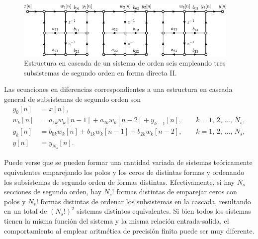 \documentclass[a4paper]{report}
\begin{document}
\begin{figure}[!htb]
 \begin{center}
 \includegraphics[width=0.96\textwidth]{figuras/structures_flow_graph_iir_cascade_direct_form_II.pdf}
 \caption{\label{fig:structures_flow_graph_iir_cascade_direct_form_II} Estructura en cascada de un sistema de orden seis empleando tres subsistemas de segundo orden en forma directa II.}
 \end{center}
\end{figure}
Las ecuaciones en diferencias correspondientes a una estructura en cascada general de subsistemas de segundo orden son
\begin{align*}
 y_0[n]&=x[n],\\
 w_k[n]&=a_{1k}w_k[n-1]+a_{2k}w_k[n-2]+y_{k-1}[n],\qquad k=1,\,2,\,\dots,\,N_s,\\
 y_k[n]&=b_{0k}w_k[n]+b_{1k}w_k[n-1]+b_{2k}w_k[n-2],\qquad k=1,\,2,\,\dots,\,N_s,\\
 y[n]&=y_{N_s}[n].
\end{align*}

Puede verse que se pueden formar una cantidad variada de sistemas teóricamente equivalentes emparejando los polos y los ceros de distintas formas y ordenando los subsistemas de segundo orden de formas distintas. Efectivamente, si hay \(N_s\) secciones de segundo orden, hay \(N_s!\) formas distintas de emparejar ceros con polos y \(N_s!\) formas distintas de ordenar los subsistemas en la cascada, resultando en un total de \((N_s!)^2\) sistemas distintos equivalentes. Si bien todos los sistemas tienen la misma función del sistema y la misma relación entrada-salida, el comportamiento al emplear aritmética de precisión finita puede ser muy diferente.
\end{document}
